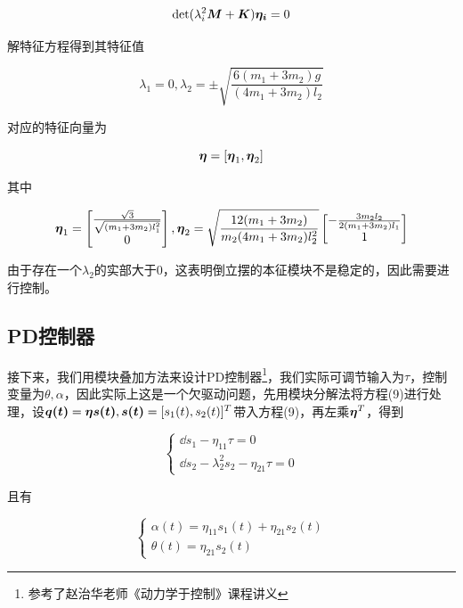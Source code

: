 \documentclass[UTF8]{ctexart}
\begin{document}
\begin{equation}
        \det(\lambda_i^2\boldsymbol{M} + \boldsymbol{K})\boldsymbol{\eta_i} = 0
\end{equation}

解特征方程得到其特征值

\begin{equation}
    \lambda_1 = 0, \lambda_2 = \pm \sqrt{\frac{6 (m_1+3 m_2)g}{(4 m_1+3 m_2) l_2}}
\end{equation}

对应的特征向量为

\begin{equation}
    \boldsymbol{\eta} = [\boldsymbol{\eta}_1, \boldsymbol{\eta}_2]
\end{equation}

其中

\begin{equation}
    \boldsymbol{\eta}_1 = \begin{bmatrix}
        \frac{\sqrt{3}}{\sqrt{(m_1+3m_2)l_1^2}}\\
        0
    \end{bmatrix},
    \boldsymbol{\eta}_2 = \sqrt{\frac{12(m_1+3m_2)}{m_2(4m_1+3m_2)l_2^2}}\begin{bmatrix}
        -\frac{3m_2l_2}{2(m_1+3m_2)l_1}\\
        1
    \end{bmatrix}
\end{equation}

由于存在一个$\lambda_2$的实部大于0，这表明倒立摆的本征模块不是稳定的，因此需要进行控制。

\subsection{PD控制器}

接下来，我们用模块叠加方法来设计PD控制器\footnote{参考了赵治华老师《动力学于控制》课程讲义}，我们实际可调节输入为$\tau$，控制变量为$\theta,\alpha$，因此实际上这是一个欠驱动问题，先用模块分解法将方程(9)进行处理，设$\boldsymbol{q(t)}=\boldsymbol{\eta}\boldsymbol{s(t)},\boldsymbol{s(t)}=[s_1(t),s_2(t)]^T$带入方程(9)，再左乘$\boldsymbol{\eta}^{T}$，得到

\begin{equation}
    \begin{cases}
        \dd{s_1}  -\eta_{11}\tau = 0\\
        \dd{s_2} - \lambda_2^2 s_2- \eta_{21}\tau = 0
    \end{cases}
\end{equation}

且有

\begin{equation}
    \begin{cases}
        \alpha(t) = \eta_{11}s_1(t) + \eta_{21}s_2(t)\\
        \theta(t) = \eta_{21}s_2(t)
    \end{cases}
\end{equation}
\end{document}
